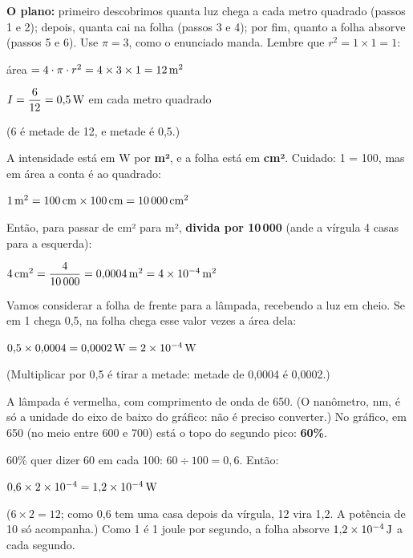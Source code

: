 \passoapasso
\textbf{O plano:} primeiro descobrimos quanta luz chega a cada metro quadrado (passos 1 e 2); depois, quanta cai na folha
(passos 3 e 4); por fim, quanto a folha absorve (passos 5 e 6).
Use $\pi = 3$, como o enunciado manda. Lembre que $r^2 = 1 \times 1 = 1$:
\begin{conta}
área $= 4 \cdot \pi \cdot r^2 = 4 \times 3 \times 1 = 12\,\text{m}^2$
\end{conta}

\begin{conta}
$I = \dfrac{6}{12} = 0{,}5\,\text{W}$ em cada metro quadrado
\end{conta}
(6 é metade de 12, e metade é 0,5.)

A intensidade está em W por \textbf{m²}, e a folha está em \textbf{cm²}. Cuidado: 1 = 100, mas em área a conta é ao quadrado:
\begin{conta}
$1\,\text{m}^2 = 100\,\text{cm} \times 100\,\text{cm} = 10\,000\,\text{cm}^2$
\end{conta}
Então, para passar de cm² para m², \textbf{divida por 10\,000} (ande a vírgula 4 casas para a esquerda):
\begin{conta}
$4\,\text{cm}^2 = \dfrac{4}{10\,000} = 0{,}0004\,\text{m}^2 = 4 \times 10^{-4}\,\text{m}^2$
\end{conta}

Vamos considerar a folha de frente para a lâmpada, recebendo a luz em cheio. Se em 1 chega 0,5, na folha chega
esse valor vezes a área dela:
\begin{conta}
$0{,}5 \times 0{,}0004 = 0{,}0002\,\text{W} = 2 \times 10^{-4}\,\text{W}$
\end{conta}
(Multiplicar por 0,5 é tirar a metade: metade de 0,0004 é 0,0002.)

A lâmpada é vermelha, com comprimento de onda de 650. (O nanômetro, nm, é só a unidade do eixo de baixo do gráfico: não é preciso converter.) No gráfico, em 650 (no meio entre 600 e 700) está o topo
do segundo pico: \textbf{60\%}.

\Needspace{110mm}%
60\% quer dizer 60 em cada 100: $60 \div 100 = 0{,}6$. Então:
\begin{conta}
$0{,}6 \times 2 \times 10^{-4} = 1{,}2 \times 10^{-4}\,\text{W}$
\end{conta}
($6 \times 2 = 12$; como 0,6 tem uma casa depois da vírgula, 12 vira 1,2. A potência de 10 só acompanha.)
Como 1 é 1 joule por segundo, a folha absorve $1{,}2 \times 10^{-4}\,\text{J}$ a cada segundo.

